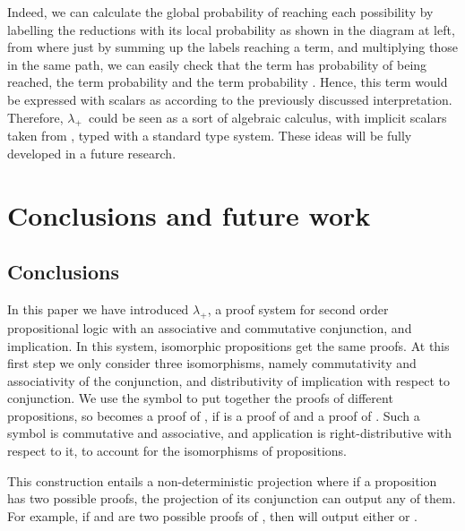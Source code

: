 \documentclass[final,copyright,creativecommons]{eptcs}
\newcommand{\OurCalculus}{\ensuremath{\lambda_+}}
\theoremstyle{definition}
\begin{document}
Indeed, we can calculate the global probability of reaching each possibility by labelling the reductions with its local probability as shown in the diagram at left, from where just by summing up the labels reaching a term, and multiplying those in the same path, we can easily check that the term  has probability  of being reached, the term  probability  and the term  probability .
Hence, this term would be expressed with
scalars as  according to the
previously discussed interpretation.
Therefore, \OurCalculus\ could be seen as a sort of algebraic calculus, with implicit scalars taken from , typed with a standard type system. These ideas will be fully developed in a future research.

\section{Conclusions and future work}\label{sec:conclusion}
\subsection{Conclusions}
In this paper we have introduced \OurCalculus, a proof system for second order propositional logic with an associative and commutative conjunction, and implication. In this system, isomorphic propositions get the same proofs. At this first step we only consider three isomorphisms, namely commutativity and associativity of the conjunction, and distributivity of implication with respect to conjunction. We use the symbol  to put together the proofs of different propositions, so  becomes a proof of , if  is a proof of  and  a proof of . Such a symbol is commutative and associative, and application is right-distributive with respect to it, to account for the isomorphisms of propositions.

This construction entails a non-deterministic projection where if a proposition has two possible proofs, the projection of its conjunction can output any of them. For example, if  and  are two possible proofs of , then  will output either  or .
\end{document}
